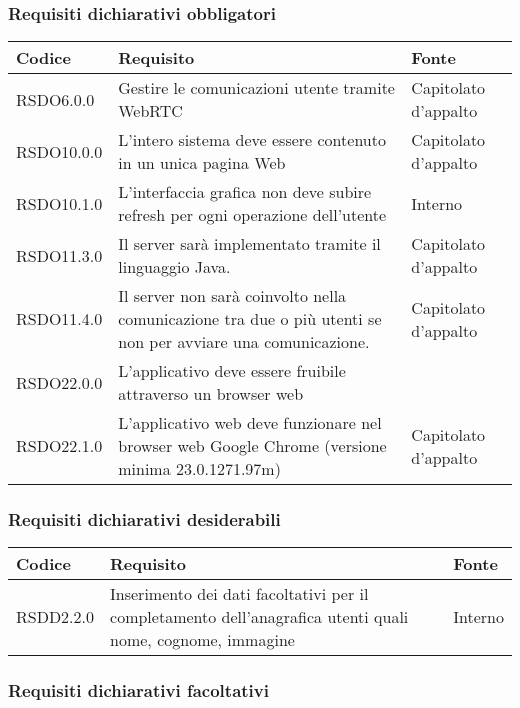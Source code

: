 \subsubsection{Requisiti dichiarativi obbligatori}

\begin{center}
\begin{longtable}{lp{}l}
\toprule Codice & Requisito & Fonte\\
\midrule
RSDO6.0.0 & Gestire le comunicazioni utente tramite WebRTC & Capitolato d'appalto \\
RSDO10.0.0 & L'intero sistema deve essere contenuto in un unica pagina Web & Capitolato d'appalto \\
RSDO10.1.0 & L'interfaccia grafica non deve subire refresh per ogni operazione dell'utente & Interno \\
RSDO11.3.0 & Il server sarà implementato tramite il linguaggio Java. & Capitolato d'appalto \\
RSDO11.4.0 & Il server non sarà coinvolto nella comunicazione tra due o più utenti se non per avviare una comunicazione. & Capitolato d'appalto \\
RSDO22.0.0 & L'applicativo deve essere fruibile attraverso un browser web &  \\
RSDO22.1.0 & L'applicativo web deve funzionare nel browser web Google Chrome (versione minima 23.0.1271.97m) & Capitolato d'appalto \\
\bottomrule
\end{longtable}
\end{center}

\subsubsection{Requisiti dichiarativi desiderabili}

\begin{center}
\begin{longtable}{lp{}l}
\toprule Codice & Requisito & Fonte\\
\midrule
RSDD2.2.0 & Inserimento dei dati facoltativi per il completamento dell'anagrafica utenti quali nome, cognome, immagine & Interno \\
\bottomrule
\end{longtable}
\end{center}

\subsubsection{Requisiti dichiarativi facoltativi}

